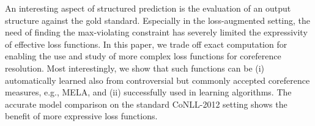 An interesting aspect of structured prediction is the evaluation of an output structure against the gold standard. Especially in the loss-augmented setting, the need of finding the max-violating constraint has severely limited the expressivity of effective loss functions. In this paper, we trade off exact computation for enabling the use and study of more complex loss functions for coreference resolution. Most interestingly, we show that such functions can be (i) automatically learned also from controversial but commonly accepted coreference measures, e.g., MELA, and (ii) successfully used in learning algorithms. The accurate model comparison on the standard CoNLL-2012 setting shows the benefit of more expressive loss functions.
